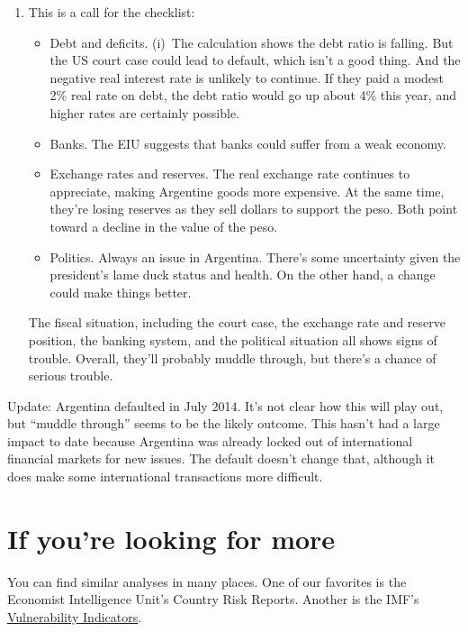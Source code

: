 \begin{enumerate}
\begin{enumerate}
\item This is a call for the checklist:
\begin{itemize}
\item Debt and deficits.
(i)~The calculation shows the debt ratio is falling.
But the US court case could lead to default,
which isn't a good thing.
And the negative real interest rate is unlikely to continue.
If they paid a modest 2\% real rate on debt, the debt ratio would
go up about 4\% this year,
and higher rates are certainly possible.

\item Banks.
The EIU suggests that banks could suffer from a weak economy.

\item Exchange rates and reserves.
The real exchange rate continues to appreciate, making 
Argentine goods more expensive.  
At the same time, they're losing reserves as they sell dollars to support the peso.  
Both point toward a decline in the value of the peso.  

\item Politics.  Always an issue in Argentina.
There's some uncertainty given the president's lame duck status and health.
On the other hand, a change could make things better.
\end{itemize}
%
The fiscal situation, including the court case, the exchange rate and reserve position,
the banking system, and the political situation all shows signs of trouble.
Overall, they'll probably muddle through,
but there's a chance of serious trouble.
\end{enumerate}
Update:  Argentina defaulted in July 2014.
It's not clear how this will play out, but ``muddle through'' seems to be the likely outcome.
This hasn't had a large impact to date because Argentina
was already locked out of international financial markets for new issues.
The default doesn't change that, although it does make some international
transactions more difficult.



\end{enumerate}
\setlength{\leftmargini}{\oldleftmargini}


\section*{If you're looking for more}

You can find similar analyses in many places.
One of our favorites is the
Economist Intelligence Unit's Country Risk Reports.
Another is the IMF's
\href{http://www.imf.org/external/np/exr/facts/vul.htm}
{Vulnerability Indicators}.

